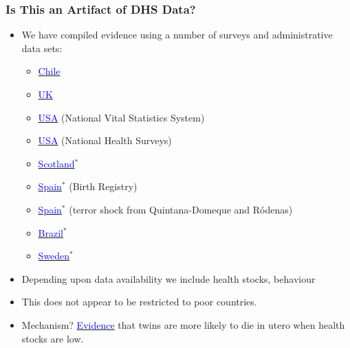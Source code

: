 \documentclass[10pt,letterpaper,subeqn]{beamer}
\begin{document}
\begin{frame}[label=c]
\frametitle{Is This an Artifact of DHS Data?}
\begin{itemize}
\item We have compiled evidence using a number of surveys and administrative data sets:
  \begin{itemize}
  \item \hyperlink{Chile}{\textcolor{blue}{Chile}}
  \item \hyperlink{UK}{\textcolor{blue}{UK}}
  \item \hyperlink{USA1}{\textcolor{blue}{USA}} (National Vital Statistics System)
  \item \hyperlink{USA2}{\textcolor{blue}{USA}} (National Health Surveys)
  \item \hyperlink{Scotland}{\textcolor{blue}{Scotland}}$^*$
  \item \hyperlink{Spain1}{\textcolor{blue}{Spain}}$^*$ (Birth Registry)
  \item \hyperlink{Spain2}{\textcolor{blue}{Spain}}$^*$ (terror shock from Quintana-Domeque and R\'odenas)
  \item \hyperlink{Brazil}{\textcolor{blue}{Brazil}}$^*$
  \item \hyperlink{Sweden}{\textcolor{blue}{Sweden}}$^*$
 \end{itemize}
\item Depending upon data availability we include health stocks, behaviour
\item This does not appear to be restricted to poor countries.
\item Mechanism?  \hyperlink{TwinDeath}{\textcolor{blue}{Evidence}} that twins are more likely to die in utero when health stocks are low.
\end{itemize}
\end{frame}



\end{document}
